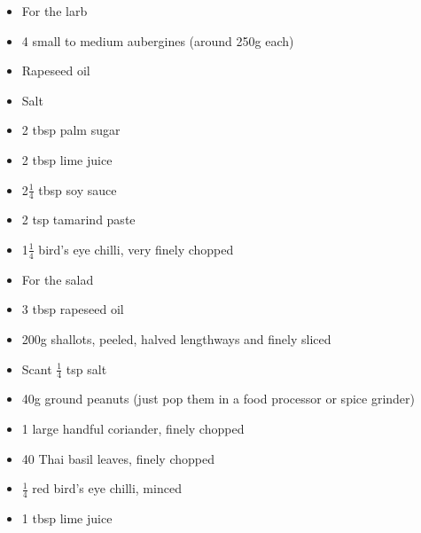 \documentclass{book}
\begin{document}
\begin{itemize}
\item For the larb
\item 4 small to medium aubergines (around 250g each) 
\item Rapeseed oil 
\item Salt 
\item 2 tbsp palm sugar 
\item 2 tbsp lime juice 
\item 2$\frac{1}{4}$ tbsp soy sauce 
\item 2 tsp tamarind paste 
\item 1$\frac{1}{4}$ bird’s eye chilli, very finely chopped 
\item For the salad 
\item 3 tbsp rapeseed oil
\item 200g shallots, peeled, halved lengthways and finely sliced
\item Scant $\frac{1}{4}$ tsp salt  
\item 40g ground peanuts (just pop them in a food processor or spice grinder)
\item 1 large handful coriander, finely chopped
\item 40 Thai basil leaves, finely chopped
\item $\frac{1}{4}$ red bird’s eye chilli, minced
\item 1 tbsp lime juice
\end{itemize}
\end{document}
